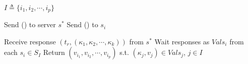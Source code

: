 \begin{algorithm*}[!ht]
\begin{algorithmic}[2]
\vspace{-1.5em}
 \\\hrulefill
\vspace{-1.5em}
      \begin{multicols}{3}{\footnotesize    
          \State $I\triangleq \{i_1, i_2, \cdots, i_p \}$
            \Part{ \underline{\readValuesAndTags}} {
          \State  Send  (\getTagArrayTag) to server $s^*$
            \State  Send (\readValuesTag) to $s_i$
             \EndFor 
             
          \State  Receive response  $(t_r, ({\kappa}_1, {\kappa}_2, \cdots, {\kappa}_k))$ from  $s^*$
            \State  Wait responses as $Vals_{i}$ from each $s_i\in S_I$
            \State Return  $(v_{i_1}, v_{i_2}, \cdots, v_{i_p})$ s.t.  $({\kappa}_{j}, v_{j}) \in Vals_{j}$, $j\in I$
          }\EndPart
        }\end{multicols}

    

\end{algorithmic}
\end{algorithm*}

